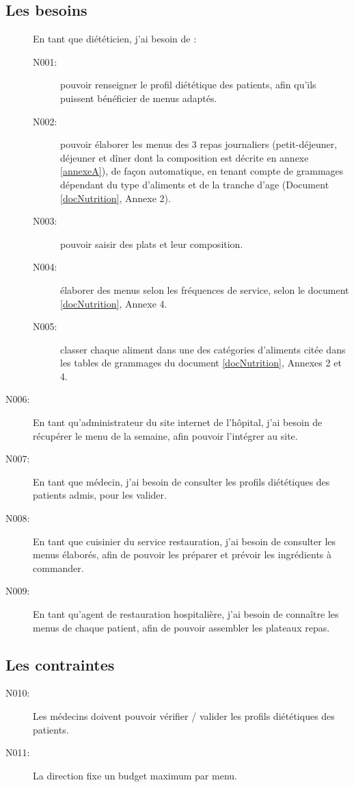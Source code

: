 \subsection{Les besoins}
\begin{description}
\item[] En tant que diététicien, j’ai besoin de :
\begin{description}
 \item[N001:] pouvoir renseigner le profil diététique des patients, afin qu’ils
 puissent bénéficier de menus adaptés.
 \item[N002:] pouvoir élaborer les menus des 3 repas journaliers
 (petit-déjeuner, déjeuner et dîner dont la composition est décrite en annexe
 \ref{annexeA}), de façon automatique, en tenant compte de grammages dépendant du type d'aliments et de la tranche d'age (Document \ref{docNutrition}, Annexe 2).
 \item[N003:] pouvoir saisir des plats et leur composition.
 \item[N004:] élaborer des menus selon les fréquences de service, selon le
 document \ref{docNutrition}, Annexe 4.
 \item[N005:] classer chaque aliment dans une des catégories d’aliments citée
 dans les tables de grammages du document \ref{docNutrition}, Annexes 2 et 4.
\end{description}
\item[N006:] En tant qu’administrateur du site internet de l’hôpital, j’ai
besoin de récupérer le menu de la semaine, afin pouvoir l’intégrer au site.
\item[N007:] En tant que médecin, j’ai besoin de consulter les profils
diététiques des patients admis, pour les  valider.
\item[N008:] En tant que cuisinier du service restauration, j’ai besoin de
consulter les menus élaborés, afin de pouvoir les préparer et prévoir les ingrédients à commander.
\item[N009:] En tant qu’agent de restauration hospitalière,  j’ai besoin de
connaître les menus de chaque patient, afin de pouvoir assembler les plateaux repas.
\end{description}
\subsection{Les contraintes}
\begin{description}
\item[N010:] Les médecins doivent pouvoir vérifier / valider les profils
diététiques des patients.
\item[N011:] La direction fixe un budget maximum par menu.
\end{description}

